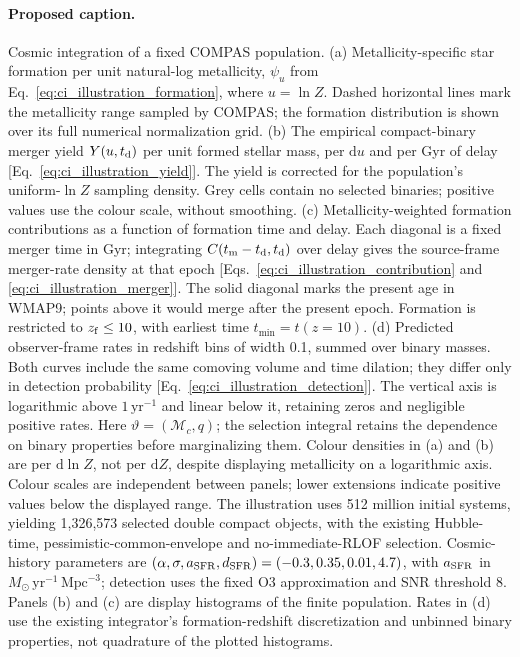 \paragraph{Proposed caption.}
Cosmic integration of a fixed COMPAS population.
(a) Metallicity-specific star formation per unit natural-log metallicity,
$\psi_u$ from Eq.~\eqref{eq:ci_illustration_formation}, where $u=\ln Z$.
Dashed horizontal lines mark the metallicity range sampled by COMPAS;
the formation distribution is shown over its full numerical normalization grid.
(b) The empirical compact-binary merger yield $Y(u,t_{\rm d})$ per unit formed
stellar mass, per $\mathrm{d}u$ and per Gyr of delay
[Eq.~\eqref{eq:ci_illustration_yield}]. The yield is corrected
for the population's uniform-$\ln Z$ sampling density. Grey cells contain no
selected binaries; positive values use the colour scale, without smoothing.
(c) Metallicity-weighted formation contributions as a function of formation
time and delay. Each diagonal is a fixed merger time in Gyr; integrating
$C(t_{\rm m}-t_{\rm d},t_{\rm d})$ over delay gives the source-frame merger-rate
density at that epoch [Eqs.~\eqref{eq:ci_illustration_contribution}
and \eqref{eq:ci_illustration_merger}]. The solid diagonal marks the present age in WMAP9;
points above it would merge after the present epoch. Formation is restricted
to $z_{\rm f}\leq10$, with earliest time $t_{\min}=t(z=10)$.
(d) Predicted observer-frame rates in redshift bins of width 0.1,
summed over binary masses. Both curves include the same comoving volume and
time dilation; they differ only in detection probability
[Eq.~\eqref{eq:ci_illustration_detection}]. The vertical axis
is logarithmic above $1\,\mathrm{yr}^{-1}$ and linear below it, retaining
zeros and negligible positive rates. Here $\vartheta=(\mathcal M_c,q)$;
the selection integral retains the dependence on binary properties before
marginalizing them. Colour densities in (a) and (b) are per $\mathrm{d}\ln Z$,
not per $\mathrm{d}Z$, despite displaying metallicity on a logarithmic axis.
Colour scales are independent between panels; lower extensions indicate
positive values below the displayed range.
The illustration uses 512 million initial systems, yielding 1,326,573 selected
double compact objects, with the existing Hubble-time, pessimistic-common-envelope
and no-immediate-RLOF selection. Cosmic-history parameters are
$(\alpha,\sigma,a_{\rm SFR},d_{\rm SFR})=(-0.3,0.35,0.01,4.7)$,
with $a_{\rm SFR}$ in $M_\odot\,\mathrm{yr}^{-1}\,\mathrm{Mpc}^{-3}$;
detection uses the fixed O3 approximation and SNR threshold 8.
Panels (b) and (c) are display histograms of the finite population.
Rates in (d) use the existing integrator's formation-redshift discretization
and unbinned binary properties, not quadrature of the plotted histograms.

